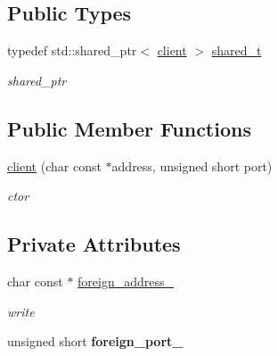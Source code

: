 \subsection*{\-Public \-Types}
\begin{DoxyCompactItemize}
\item 
\hypertarget{classgal_1_1network_1_1client_a87ba8d69e62ce4ee5895913bf597ad6f}{typedef std\-::shared\-\_\-ptr$<$ \hyperlink{classgal_1_1network_1_1client}{client} $>$ \hyperlink{classgal_1_1network_1_1client_a87ba8d69e62ce4ee5895913bf597ad6f}{shared\-\_\-t}}\label{classgal_1_1network_1_1client_a87ba8d69e62ce4ee5895913bf597ad6f}

\begin{DoxyCompactList}\small\item\em shared\-\_\-ptr \end{DoxyCompactList}\end{DoxyCompactItemize}
\subsection*{\-Public \-Member \-Functions}
\begin{DoxyCompactItemize}
\item 
\hypertarget{classgal_1_1network_1_1client_a96e27f11ea9281a51109d3fe6e419bee}{\hyperlink{classgal_1_1network_1_1client_a96e27f11ea9281a51109d3fe6e419bee}{client} (char const $\ast$address, unsigned short port)}\label{classgal_1_1network_1_1client_a96e27f11ea9281a51109d3fe6e419bee}

\begin{DoxyCompactList}\small\item\em ctor \end{DoxyCompactList}\end{DoxyCompactItemize}
\subsection*{\-Private \-Attributes}
\begin{DoxyCompactItemize}
\item 
char const $\ast$ \hyperlink{classgal_1_1network_1_1client_a50f554a8893793fdd9e0a2d53b79f60e}{foreign\-\_\-address\-\_\-}
\begin{DoxyCompactList}\small\item\em write \end{DoxyCompactList}\item 
\hypertarget{classgal_1_1network_1_1client_acbf9159db97d571507ae2a241ee6af22}{unsigned short {\bfseries foreign\-\_\-port\-\_\-}}\label{classgal_1_1network_1_1client_acbf9159db97d571507ae2a241ee6af22}

\end{DoxyCompactItemize}


